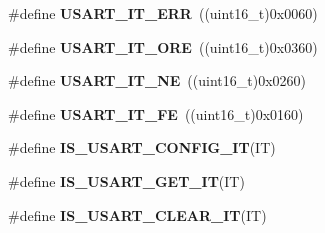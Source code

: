 \begin{DoxyCompactItemize}
\item 
\hypertarget{group__USART__Interrupt__definition_ga631e83efd4c4789128d80a9539faf78a}{
\#define {\bfseries USART\_\-IT\_\-ERR}~((uint16\_\-t)0x0060)}
\label{group__USART__Interrupt__definition_ga631e83efd4c4789128d80a9539faf78a}

\item 
\hypertarget{group__USART__Interrupt__definition_ga8b7d40e02a81be787fbb325bbe6dfbeb}{
\#define {\bfseries USART\_\-IT\_\-ORE}~((uint16\_\-t)0x0360)}
\label{group__USART__Interrupt__definition_ga8b7d40e02a81be787fbb325bbe6dfbeb}

\item 
\hypertarget{group__USART__Interrupt__definition_gad5de042f579b50f1e8643009176486b3}{
\#define {\bfseries USART\_\-IT\_\-NE}~((uint16\_\-t)0x0260)}
\label{group__USART__Interrupt__definition_gad5de042f579b50f1e8643009176486b3}

\item 
\hypertarget{group__USART__Interrupt__definition_ga9af8790f78f6cb1591506c57d0cc0fb3}{
\#define {\bfseries USART\_\-IT\_\-FE}~((uint16\_\-t)0x0160)}
\label{group__USART__Interrupt__definition_ga9af8790f78f6cb1591506c57d0cc0fb3}

\item 
\#define {\bfseries IS\_\-USART\_\-CONFIG\_\-IT}(IT)
\item 
\#define {\bfseries IS\_\-USART\_\-GET\_\-IT}(IT)
\item 
\#define {\bfseries IS\_\-USART\_\-CLEAR\_\-IT}(IT)
\end{DoxyCompactItemize}


